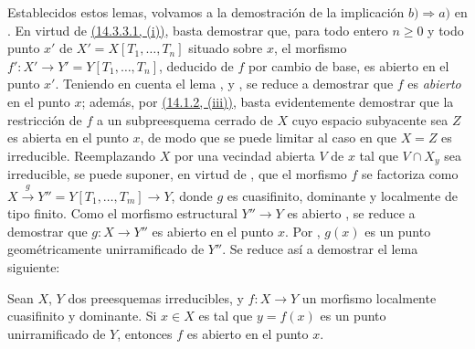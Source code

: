 Establecidos estos lemas, volvamos a la demostración de la implicación $b)\Rightarrow
a)$ en .
En virtud de {\hyperlink{ega4.c04.subsec.14-3-3-1}{(14.3.3.1, (i))}}, basta demostrar que, para todo entero $n\geq 0$ y todo punto $x'$ de $X'=X[T_1,\ldots,T_n]$ situado sobre $x$, el morfismo
$f':X'\to Y'=Y[T_1,\ldots,T_n]$, deducido de $f$ por cambio de base, es abierto en el punto $x'$.
Teniendo en cuenta el lema ,  y , se reduce a demostrar que $f$ es \emph{abierto} en el punto $x$; además, por {\hyperlink{ega4.c04.prop.14-1-2}{(14.1.2, (iii))}}, basta evidentemente demostrar que la restricción de $f$ a un subpreesquema cerrado de $X$ cuyo espacio subyacente sea $Z$ es abierta en el punto $x$, de modo que se puede limitar al caso en que $X=Z$ es irreducible.
Reemplazando $X$ por una vecindad abierta $V$ de $x$ tal que $V\cap X_y$ sea irreducible, se puede suponer, en virtud de , que el morfismo $f$ se factoriza como $X\xrightarrow{g}Y''=Y[T_1,\ldots,T_m]\to Y$, donde $g$ es cuasifinito, dominante y localmente de tipo finito.
Como el morfismo estructural $Y''\to Y$ es abierto , se reduce a demostrar que $g:X\to Y''$ es abierto en el punto $x$.
Por , $g(x)$ es un punto geométricamente unirramificado de $Y''$.
Se reduce así a demostrar el lema siguiente:

\begin{lemma}[14.4.1.3]
\label{IV.14.4.1.3}
Sean $X$, $Y$ dos preesquemas irreducibles, y $f:X\to Y$ un morfismo localmente cuasifinito y dominante.
Si $x\in X$ es tal que $y=f(x)$ es un punto unirramificado de $Y$, entonces $f$ es abierto en el punto $x$.
\end{lemma}


